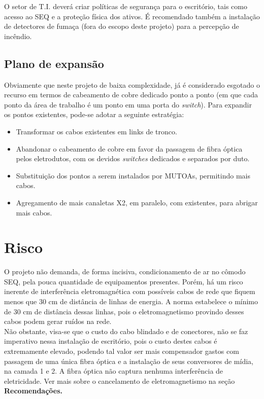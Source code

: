\documentclass[	DIV=calc,%
							paper=a4,%
							fontsize=12pt,%
							onecolumn]{scrartcl}	 					%
\begin{document}
O setor de T.I. deverá criar políticas de segurança para o escritório, tais como acesso ao SEQ e a proteção física dos ativos. É recomendado também a instalação de detectores de fumaça (fora do escopo deste projeto) para a percepção de incêndio.

\subsection{Plano de expansão}

Obviamente que neste projeto de baixa complexidade, já é considerado esgotado o recurso em termos de cabeamento de cobre dedicado ponto a ponto (em que cada ponto da área de trabalho é um ponto em uma porta do \textit{switch}). Para expandir os pontos existentes, pode-se adotar a seguinte estratégia:
\\

\begin{itemize}
	\item Transformar os cabos existentes em links de tronco.
	\\
	\item Abandonar o cabeamento de cobre em favor da passagem de fibra óptica pelos eletrodutos, com os devidos \textit{switches} dedicados e separados por duto.
	\\
	\item Substituição dos pontos a serem instalados por MUTOAs, permitindo mais cabos.
	\\
	\item Agregamento de mais canaletas X2, em paralelo, com existentes, para abrigar mais cabos.
\end{itemize}


\section{Risco}

O projeto não demanda, de forma incisiva, condicionamento de ar no cômodo SEQ, pela pouca quantidade de equipamentos presentes. Porém, há um risco inerente de interferência eletromagnética com possíveis cabos de rede que fiquem menos que 30 cm de distância de linhas de energia. A norma estabelece o mínimo de 30 cm de distância dessas linhas, pois o eletromagnetismo provindo desses cabos podem gerar ruídos na rede.
\\

Não obstante, visa-se que o custo do cabo blindado e de conectores, não se faz imperativo nessa instalação de escritório, pois o custo destes cabos é extremamente elevado, podendo tal valor ser mais compensador gastos com passagem de uma única fibra óptica e a instalação de seus conversores de mídia, na camada 1 e 2. A fibra óptica não captura nenhuma interferência de eletricidade. Ver mais sobre o cancelamento de eletromagnetismo na seção \textbf{Recomendações.}
\\
\end{document}
